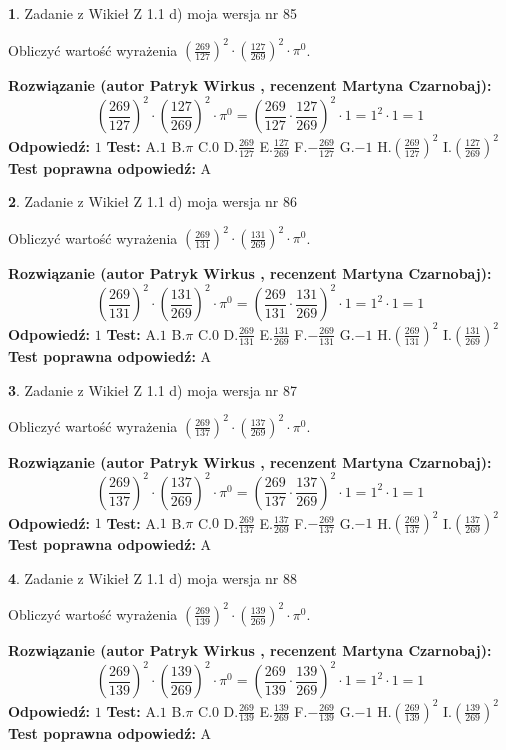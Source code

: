 \documentclass[12pt, a4paper]{article}
\theoremstyle{definition} %
\newtheorem{zad}{}
\newcommand{\zadStart}[1]{\begin{zad}#1\newline}
\newcommand{\zadStop}{\end{zad}}
\newcommand{\rozwStart}[2]{\noindent \textbf{Rozwiązanie (autor #1 , recenzent #2): }\newline}
\newcommand{\rozwStop}{\newline}
\newcommand{\odpStart}{\noindent \textbf{Odpowiedź:}\newline}
\newcommand{\odpStop}{\newline}
\newcommand{\testStart}{\noindent \textbf{Test:}\newline}
\newcommand{\testStop}{\newline}
\newcommand{\kluczStart}{\noindent \textbf{Test poprawna odpowiedź:}\newline}
\newcommand{\kluczStop}{\newline}
\begin{document}
\zadStart{Zadanie z Wikieł Z 1.1 d) moja wersja nr 85}

Obliczyć wartość wyrażenia $(\frac{269}{127})^{2} \cdot (\frac{127}{269})^{2} \cdot \pi^{0}$.
\zadStop
\rozwStart{Patryk Wirkus}{Martyna Czarnobaj}
$$(\frac{269}{127})^{2} \cdot (\frac{127}{269})^{2} \cdot \pi^{0} = (\frac{269}{127} \cdot \frac{127}{269})^{2} \cdot 1 = 1^{2} \cdot 1 = 1$$
\rozwStop
\odpStart
$1$
\odpStop
\testStart
A.$1$ B.$\pi$ C.$0$ D.$\frac{269}{127}$ E.$\frac{127}{269}$
F.$-\frac{269}{127}$ G.$-1$
H.$(\frac{269}{127})^{2}$
I.$(\frac{127}{269})^{2}$
\testStop
\kluczStart
A
\kluczStop



\zadStart{Zadanie z Wikieł Z 1.1 d) moja wersja nr 86}

Obliczyć wartość wyrażenia $(\frac{269}{131})^{2} \cdot (\frac{131}{269})^{2} \cdot \pi^{0}$.
\zadStop
\rozwStart{Patryk Wirkus}{Martyna Czarnobaj}
$$(\frac{269}{131})^{2} \cdot (\frac{131}{269})^{2} \cdot \pi^{0} = (\frac{269}{131} \cdot \frac{131}{269})^{2} \cdot 1 = 1^{2} \cdot 1 = 1$$
\rozwStop
\odpStart
$1$
\odpStop
\testStart
A.$1$ B.$\pi$ C.$0$ D.$\frac{269}{131}$ E.$\frac{131}{269}$
F.$-\frac{269}{131}$ G.$-1$
H.$(\frac{269}{131})^{2}$
I.$(\frac{131}{269})^{2}$
\testStop
\kluczStart
A
\kluczStop



\zadStart{Zadanie z Wikieł Z 1.1 d) moja wersja nr 87}

Obliczyć wartość wyrażenia $(\frac{269}{137})^{2} \cdot (\frac{137}{269})^{2} \cdot \pi^{0}$.
\zadStop
\rozwStart{Patryk Wirkus}{Martyna Czarnobaj}
$$(\frac{269}{137})^{2} \cdot (\frac{137}{269})^{2} \cdot \pi^{0} = (\frac{269}{137} \cdot \frac{137}{269})^{2} \cdot 1 = 1^{2} \cdot 1 = 1$$
\rozwStop
\odpStart
$1$
\odpStop
\testStart
A.$1$ B.$\pi$ C.$0$ D.$\frac{269}{137}$ E.$\frac{137}{269}$
F.$-\frac{269}{137}$ G.$-1$
H.$(\frac{269}{137})^{2}$
I.$(\frac{137}{269})^{2}$
\testStop
\kluczStart
A
\kluczStop



\zadStart{Zadanie z Wikieł Z 1.1 d) moja wersja nr 88}

Obliczyć wartość wyrażenia $(\frac{269}{139})^{2} \cdot (\frac{139}{269})^{2} \cdot \pi^{0}$.
\zadStop
\rozwStart{Patryk Wirkus}{Martyna Czarnobaj}
$$(\frac{269}{139})^{2} \cdot (\frac{139}{269})^{2} \cdot \pi^{0} = (\frac{269}{139} \cdot \frac{139}{269})^{2} \cdot 1 = 1^{2} \cdot 1 = 1$$
\rozwStop
\odpStart
$1$
\odpStop
\testStart
A.$1$ B.$\pi$ C.$0$ D.$\frac{269}{139}$ E.$\frac{139}{269}$
F.$-\frac{269}{139}$ G.$-1$
H.$(\frac{269}{139})^{2}$
I.$(\frac{139}{269})^{2}$
\testStop
\kluczStart
A
\kluczStop
\end{document}

